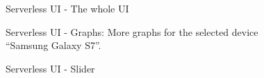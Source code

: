 \begin{figure}[H]
  \centering
  \caption{Serverless UI - The whole UI}
  \label{fig:ui}
\end{figure}

\begin{figure}[H]
  \centering
  \caption{Serverless UI - Graphs: More graphs for the selected device “Samsung Galaxy S7”.}
\end{figure}

\begin{figure}[H]
  \centering
  \caption{Serverless UI - Slider}
\end{figure}
